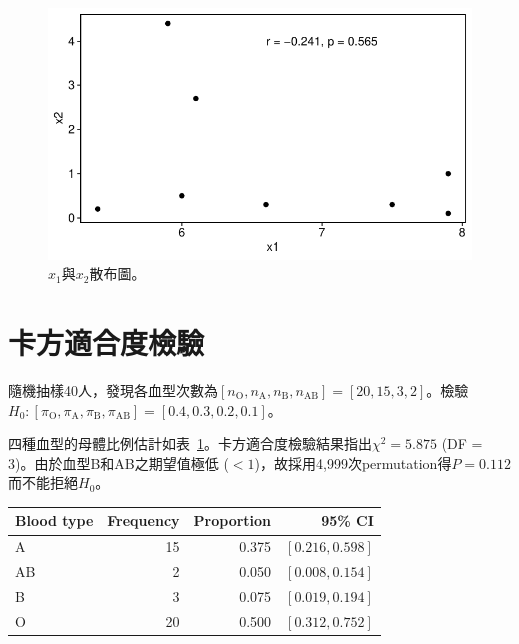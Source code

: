 \documentclass[12pt]{article}
\renewcommand{\tablename}{表}
\newcommand*{\tableref}[1]{\tablename~\ref{#1}}
\begin{document}
\begin{figure}[htbp]
	\centering
	\includegraphics[]{spearman_cor.pdf}
	\caption{$x_1$與$x_2$散布圖。}
	\label{fig:spearman_cor}
\end{figure}

\section{卡方適合度檢驗}
隨機抽樣40人，發現各血型次數為$[n_{\mathrm{O}}, n_{\mathrm{A}}, n_{\mathrm{B}}, n_{\mathrm{AB}}] = [20,15,3,2]$。檢驗$H_0: [\pi_{\mathrm{O}}, \pi_{\mathrm{A}}, \pi_{\mathrm{B}}, \pi_{\mathrm{AB}}] = [0.4,0.3,0.2,0.1]$。

四種血型的母體比例估計如\tableref{table:chisq_goodness}。卡方適合度檢驗結果指出$\chi^2 = 5.875$ (DF = 3)。由於血型B和AB之期望值極低 ($<1$)，故採用4,999次permutation得$P = 0.112$而不能拒絕$H_0$。

\begin{table}[htbp]
	\centering
	\begin{tabular}{lrrr}
		\hline
		Blood type & Frequency & Proportion & 95\% CI \\ 
		\hline
		A & 15 & 0.375 & $\left[0.216, 0.598\right]$ \\ 
		AB & 2 & 0.050 & $\left[0.008, 0.154\right]$ \\ 
		B & 3 & 0.075 & $\left[0.019, 0.194\right]$ \\ 
		O & 20 & 0.500 & $\left[0.312, 0.752\right]$ \\ 
		\hline
	\end{tabular}
	\label{table:chisq_goodness}
\end{table}

\end{document}
